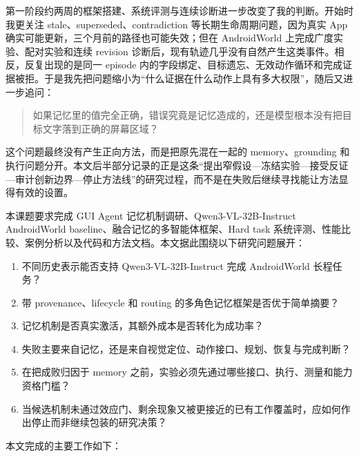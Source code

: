 \documentclass[12pt,a4paper]{ctexart}
\begin{document}
第一阶段约两周的框架搭建、系统评测与连续诊断进一步改变了我的判断。开始时我更关注 stale、superseded、contradiction 等长期生命周期问题，因为真实 App 确实可能更新，三个月前的路径也可能失效；但在 AndroidWorld 上完成广度实验、配对实验和连续 revision 诊断后，现有轨迹几乎没有自然产生这类事件。相反，反复出现的是同一 episode 内的字段绑定、目标遗忘、无效动作循环和完成证据被拒。于是我先把问题缩小为“什么证据在什么动作上具有多大权限”，随后又进一步追问：

\begin{quote}
如果记忆里的值完全正确，错误究竟是记忆造成的，还是模型根本没有把目标文字落到正确的屏幕区域？
\end{quote}

这个问题最终没有产生正向方法，而是把原先混在一起的 memory、grounding 和执行问题分开。本文后半部分记录的正是这条“提出窄假设---冻结实验---接受反证---审计创新边界---停止方法线”的研究过程，而不是在失败后继续寻找能让方法显得有效的设置。

本课题要求完成 GUI Agent 记忆机制调研、Qwen3-VL-32B-Instruct AndroidWorld baseline、融合记忆的多智能体框架、Hard task 系统评测、性能比较、案例分析以及代码和方法文档。本文据此围绕以下研究问题展开：

\begin{enumerate}[label=RQ\arabic*：,leftmargin=2.7em]
    \item 不同历史表示能否支持 Qwen3-VL-32B-Instruct 完成 AndroidWorld 长程任务？
    \item 带 provenance、lifecycle 和 routing 的多角色记忆框架是否优于简单摘要？
    \item 记忆机制是否真实激活，其额外成本是否转化为成功率？
    \item 失败主要来自记忆，还是来自视觉定位、动作接口、规划、恢复与完成判断？
    \item 在把成败归因于 memory 之前，实验必须先通过哪些接口、执行、测量和能力资格门槛？
    \item 当候选机制未通过效应门、剩余现象又被更接近的已有工作覆盖时，应如何作出停止而非继续包装的研究决策？
\end{enumerate}

本文完成的主要工作如下：
\end{document}
